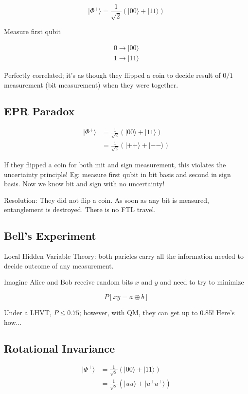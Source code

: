 \documentclass{article}
\newcommand{\<}{\langle}
\renewcommand{\>}{\rangle}
\newcommand{\q}[1] {|{#1 \rangle}}
\begin{document}
$$
\q{\Phi^+} = \frac{1}{\sqrt 2} (\q{00} + \q{11})
$$

Measure first qubit

\begin{align}
0 \to \q{00} \\
1 \to \q{11}
\end{align}

Perfectly correlated; it's as though they flipped a coin to decide result of $0/1$ measurement (bit measurement) when they were together.

\subsection{EPR Paradox}

\begin{align}
\q{\Phi^+} &= \frac{1}{\sqrt 2} (\q{00} + \q{11}) \\
&= \frac{1}{\sqrt 2}(\q{++} + \q{--})
\end{align}

If they flipped a coin for both mit and sign measurement, this violates the uncertainty principle! Eg: measure first qubit in bit basis and second in sign basis. Now we know bit and sign with no uncertainty!

Resolution: They did not flip a coin. As soon as any bit is measured, entanglement is destroyed. There is no FTL travel.

\subsection{Bell's Experiment}

Local Hidden Variable Theory: both paricles carry all the information needed to decide outcome of any measurement.

Imagine Alice and Bob receive random bits $x$ and $y$ and need to try to minimize

$$
P[xy = a \oplus b]
$$

Under a LHVT, $ P \le 0.75$; however, with QM, they can get up to 0.85! Here's how...

\subsection{Rotational Invariance}


\begin{align}
\q{\Phi^+} &= \frac{1}{\sqrt 2} (\q{00} + \q{11}) \\
&= \frac{1}{\sqrt 2} (\q{uu} + \q{u^\perp u^\perp})
\end{align}
\end{document}
